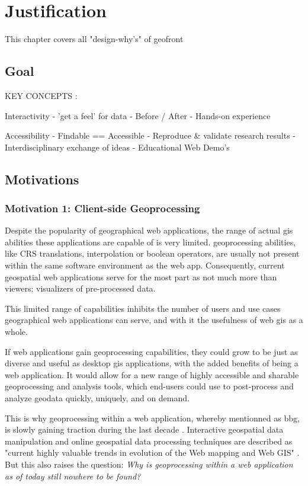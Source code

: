 \chapter{Justification}%

This chapter covers all "design-why's" of geofront 

\section{Goal}

KEY CONCEPTS :

Interactivity
- 'get a feel' for data
- Before / After
- Hands-on experience

Accessibility
- Findable == Accessible
- Reproduce \& validate research results 
- Interdisciplinary exchange of ideas 
- Educational Web Demo's


\section{Motivations}

\subsection{Motivation 1: Client-side Geoprocessing}

Despite the popularity of geographical web applications, the range of actual \ac{gis} abilities these applications are capable of is very limited. \ac{geoprocessing} abilities, like CRS translations, interpolation or boolean operators, are usually not present within the same software environment as the web app. Consequently, current geospatial web applications serve for the most part as not much more than viewers; visualizers of pre-processed data. 

This limited range of capabilities inhibits the number of users and use cases geographical web applications can serve, and with it the usefulness of web \ac{gis} as a whole. 

If web applications gain \ac{geoprocessing} capabilities, they could grow to be just as diverse and useful as desktop \ac{gis} applications, with the added benefits of being a web application. It would allow for a new range of highly accessible and sharable geoprocessing and analysis tools, which end-users could use to post-process and analyze geodata quickly, uniquely, and on demand.

This is why \ac{geoprocessing} within a web application, whereby mentionned as \ac{bbg}, is slowly gaining traction during the last decade \cite{kulawiak_analysis_2019, panidi_hybrid_2015, hamilton_client-side_2014}. Interactive geospatial data manipulation and online geospatial data processing techniques are described as "current highly valuable trends in evolution of the Web mapping and Web GIS" \cite{panidi_hybrid_2015}. But this also raises the question: \textit{Why is geoprocessing within a web application as of today still nowhere to be found?} 

